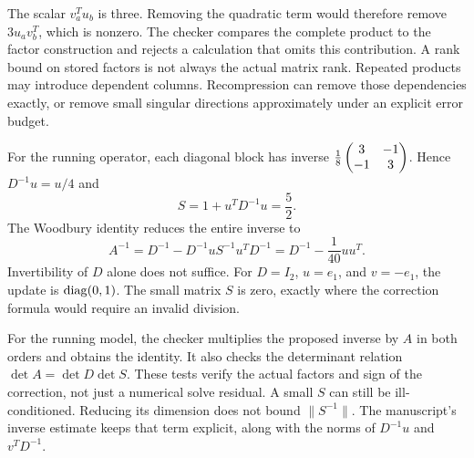 The scalar $v_a^Tu_b$ is three. Removing the quadratic term would therefore remove $3u_av_b^T$, which is nonzero. The checker compares the complete product to the factor construction and rejects a calculation that omits this contribution.
A rank bound on stored factors is not always the actual matrix rank. Repeated products may introduce dependent columns. Recompression can remove those dependencies exactly, or remove small singular directions approximately under an explicit error budget.

For the running operator, each diagonal block has inverse $\frac18\begin{pmatrix}3&-1\\-1&3\end{pmatrix}$. Hence $D^{-1}u=u/4$ and
\[
S=1+u^TD^{-1}u=\frac52.
\]
The Woodbury identity reduces the entire inverse to
\[
A^{-1}=D^{-1}-D^{-1}uS^{-1}u^TD^{-1}
=D^{-1}-\frac1{40}uu^T.
\]
Invertibility of $D$ alone does not suffice. For $D=I_2$, $u=e_1$, and $v=-e_1$, the update is $\operatorname{diag}(0,1)$. The small matrix $S$ is zero, exactly where the correction formula would require an invalid division.

For the running model, the checker multiplies the proposed inverse by $A$ in both orders and obtains the identity. It also checks the determinant relation $\det A=\det D\det S$. These tests verify the actual factors and sign of the correction, not just a numerical solve residual.
A small $S$ can still be ill-conditioned. Reducing its dimension does not bound $\|S^{-1}\|$. The manuscript's inverse estimate keeps that term explicit, along with the norms of $D^{-1}u$ and $v^TD^{-1}$.

